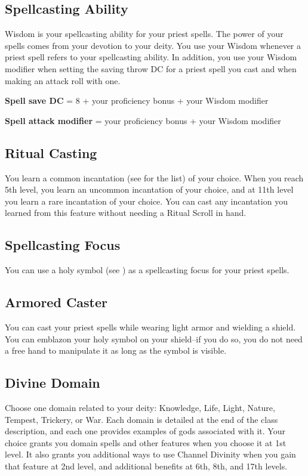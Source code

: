 \subsection{Spellcasting Ability}

Wisdom is your spellcasting ability for your priest spells. The power of your spells comes from your devotion to your deity. You use your Wisdom whenever a priest spell refers to your spellcasting ability. In addition, you use your Wisdom modifier when setting the saving throw DC for a priest spell you cast and when making an attack roll with one.

\textbf{Spell save DC} = 8 + your proficiency bonus + your Wisdom modifier

\textbf{Spell attack modifier} = your proficiency bonus + your Wisdom modifier

\subsection{Ritual Casting}

You learn a common incantation (see  for the list) of your choice. When you reach 5th level, you learn an uncommon incantation of your choice, and at 11th level you learn a rare incantation of your choice. You can cast any incantation you learned from this feature without needing a Ritual Scroll in hand.

\subsection{Spellcasting Focus}

You can use a holy symbol (see ) as a spellcasting focus for your priest spells.

\subsection{Armored Caster}
You can cast your priest spells while wearing light armor and wielding a shield. You can emblazon your holy symbol on your shield--if you do so, you do not need a free hand to manipulate it as long as the symbol is visible.

\subsection{Divine Domain}

Choose one domain related to your deity: Knowledge, Life, Light, Nature, Tempest, Trickery, or War. Each domain is detailed at the end of the class description, and each one provides examples of gods associated with it. Your choice grants you domain spells and other features when you choose it at 1st level. It also grants you additional ways to use Channel Divinity when you gain that feature at 2nd level, and additional benefits at 6th, 8th, and 17th levels.

